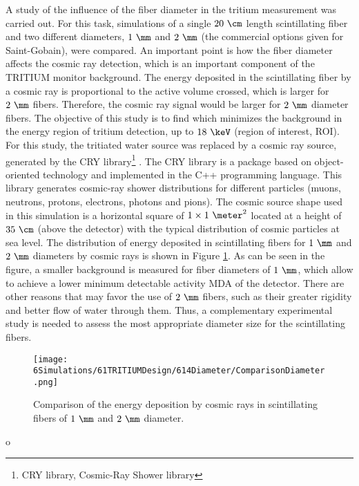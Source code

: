 A study of the influence of the fiber diameter in the tritium measurement was carried out. For this task, simulations of a single $20~\cm$ length scintillating fiber and two different diameters, $1~\mm$ and $2~\mm$ (the commercial options given for Saint-Gobain), were compared. An important point is how the fiber diameter affects the cosmic ray detection, which is an important component of the TRITIUM monitor background. The energy deposited in the scintillating fiber by a cosmic ray is proportional to the active volume crossed, which is larger for $2~\mm$ fibers. Therefore, the cosmic ray signal would be larger for $2~\mm$ diameter fibers. The objective of this study is to find which minimizes the background in the energy region of tritium detection, up to $18~\keV$ (region of interest, ROI). For this study, the tritiated water source was replaced by a cosmic ray source, generated by the CRY library\footnote{CRY library, Cosmic-Ray Shower library} \cite{CRYwebsite, CRYpaper}. The CRY library is a package based on object-oriented technology and implemented in the C++ programming language. This library generates cosmic-ray shower distributions for different particles (muons, neutrons, protons, electrons, photons and pions). The cosmic source shape used in this simulation is a horizontal square of $1 \times 1~\meter ^2$ located at a height of $35~\cm$ (above the detector) with the typical distribution of cosmic particles at sea level. The distribution of energy deposited in scintillating fibers for $1~\mm$ and $2~\mm$ diameters by cosmic rays is shown in Figure \ref{fig:DiameterComparison}. As can be seen in the figure, a smaller background is measured for fiber diameters of $1~\mm$, which allow to achieve a lower minimum detectable activity MDA of the detector. There are other reasons that may favor the use of $2~\mm$ fibers, such as their greater rigidity and better flow of water through them. Thus, a complementary experimental study is needed to assess the most appropriate diameter size for the scintillating fibers.

\begin{figure}[hbtp]
\centering
\texttt{[image: 6Simulations/61TRITIUMDesign/614Diameter/ComparisonDiameter.png]}
\caption{Comparison of the energy deposition by cosmic rays in scintillating fibers of $1~\mm$ and $2~\mm$ diameter.\label{fig:DiameterComparison}}
\end{figure}o